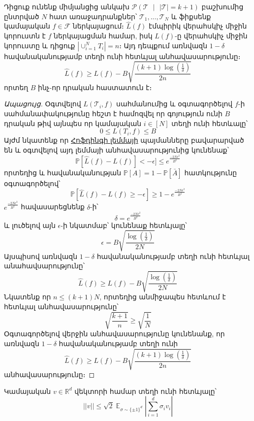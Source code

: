 \documentclass[11pt]{article}
\DeclareMathOperator*{\E}{\mathbb{E}}
\begin{document}
\begin{lemma}
Դիցուք ունենք միմյանցից անկախ $\mathcal{P}(\mathcal{T} \text{ } |\text{ }  |\mathcal{T}| = k +1)$ բաշխումից ընտրված $N$ հատ առաջադրանքներ՝ $\mathcal{T}_1, ..., \mathcal{T}_N$ և ֆիքսենք կամայական $f \in \mathcal{F}$ ներկայացում։ $\hat{L}(f)$ էմպիրիկ վերահսկիչ միջին կորուստն է $f$ ներկայացման համար,  իսկ $L(f)$-ը վերահսկիչ միջին կորուստը և դիցուք $|\cup_{i=1}^N{T_i}| = n$։
Այդ դեպքում առնվազն $1-\delta$ հավանականությամբ տեղի ունի հետևյալ անհավասարությունը։
\begin{equation}
\hat{L}(f) \geq L(f) - B\sqrt{\frac{\left(k+1\right)\log \left(\frac{1}{\delta}\right) }{2n}}
\end{equation}
որտեղ $B$ ինչ-որ դրական հաստատուն է։
\end{lemma}
\begin{proof}[Ապացույց]
Օգտվելով $L(\mathcal{T}_i, f)$ սահմանումից և օգտագործելով $f$-ի սահմանափակությունը հեշտ է համոզվել որ գոյություն ունի $B$ դրական թիվ այնպես որ կամայական $i \in [N]$ տեղի ունի հետևալը՝
$$0 \leq L(T_i,f) \leq B$$
Այժմ նկատենք որ \hyperref [hofding_inq]{Հոֆդինգի լեմմայի} պայմանները բավարարված են և օգտվելով այդ լեմմայի անհավասարությունից կունենաք՝
$$\mathbb{P}[\hat{L}(f) - L(f)]< -\epsilon] \leq e^{\frac{-2N\epsilon^2}{B^2}}$$
որտեղից և հավանականության $\mathbb{P}[A] = 1 - \mathbb{P}[\bar A]$ հատկությունը օգտագործելով՝
$$\mathbb{P}[\hat{L}(f) - L(f) \geq -\epsilon] \geq 1 -e^{\frac{-2N\epsilon^2}{B^2}} $$
$e^{\frac{-2N\epsilon^2}{B^2}}$ հավասարեցնենք $\delta$-ի՝
$$\delta = e^{\frac{-2N\epsilon^2}{B^2}}$$
և լուծելով այն $\epsilon$-ի նկատմաբ՝ կունենաք հետևյալը՝
$$\epsilon = B \sqrt{ \frac{\log\left(\frac{1}{\delta}\right)}{2N}} $$
Այսպիսով առնվազն $1-\delta$ հավանականությամբ տեղի ունի հետևյալ անահավսարությունը՝
$$\hat{L}(f) \geq L(f) - B \sqrt{ \frac{\log\left(\frac{1}{\delta}\right)}{2N}}$$
Նկատենք որ $n \leq (k+1)N$, որտեղից անմիջապես հետևում է հետևյալ անհավասարությունը՝
$$\sqrt{\frac{k+1}{n}} \geq \sqrt{\frac{1}{N}}$$
Օգտագործելով վերջին անհավասարությունը կունենանք, որ առնվազն $1-\delta$ հավանականությամբ տեղի ունի
$$\hat{L}(f) \geq L(f) - B\sqrt{\frac{\left(k+1\right)\log \left(\frac{1}{\delta}\right) }{2n}}$$
անհավասարությունը։
\end{proof}
\begin{preposition}
\label{prep_vec_ineq}
Կամայական $v \in \mathbb{R}^d$ վեկտորի համար տեղի ունի հետևյալը՝
$$||v|| \leq \sqrt{2}\E_{\sigma \sim \{\pm1\}^d} \left| \sum_{i=1}^d \sigma_iv_i \right|$$
\end{preposition}
\end{document}
